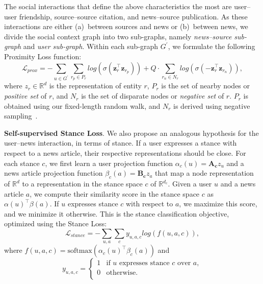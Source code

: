 \documentclass[sigconf]{acmart}
\theoremstyle{definition}
\theoremstyle{hypothesis}
\begin{document}
The social interactions that define the above characteristics the most are user--user friendship, source--source citation, and news--source publication. As these interactions are either (a)~between sources and news or (b)~between news, we divide the social context graph into two sub-graphs, namely \emph{news--source sub-graph} and \emph{user sub-graph}. 
Within each sub-graph $G^{\prime}$, we formulate the following Proximity Loss function:
\begin{equation}\label{eq:proximity_loss}
    \mathcal{L}_{prox} =  - \sum_{u\in G^{\prime}} \sum_{r_p\in P_r} log(\sigma(\boldsymbol{z}_r^\top \boldsymbol{z}_{r_p})) + Q \cdot \sum_{r_n\in N_r} log(\sigma(-\boldsymbol{z}_r^\top \boldsymbol{z}_{r_n})), 
\end{equation}
where $z_r\in \mathbb{R}^d$ is the representation of entity $r$, $P_r$ is the set of nearby nodes or \textit{positive set} of $r$, and $N_r$ is the set of disparate nodes or \textit{negative set} of $r$.
$P_{r}$ is obtained using our fixed-length
random walk, and $N_{r}$ is derived using negative sampling~\cite{Hamilton2017InductiveRL}. 

\textbf{Self-supervised Stance Loss}.
We also propose an analogous hypothesis for the user--news interaction, in terms of stance. If a user expresses a stance with respect to a news article, their respective representations should be close. For each stance $c$, we first learn a user projection function $\alpha_c(u) = \mathbf{A_c} z_u$ and a news article projection function $\beta_c(a) = \mathbf{B_c} z_a$ that map a node representation of $\mathbb{R}^d$ to a representation in the stance space $c$ of $\mathbb{R}^{d_c}$. Given a user $u$ and a news article $a$, we compute their similarity score in the
stance space $c$ as $\alpha(u)^\top \beta(a)$. If $u$ expresses stance $c$ with respect to $a$, we maximize this score, and we minimize it otherwise. This is the stance classification objective, optimized using the Stance Loss: 
\begin{equation}\label{eq:stance_loss}
    \mathcal{L}_{stance} = -\sum_{u,a}\sum_{c} y_{u,a,c} log(f(u,a,c)), 
\end{equation}
where $f(u,a,c) = \text{softmax}(\alpha_c(u)^\top \beta_c(a))$ and
\[  y_{u,a,c} = \left\{
\begin{array}{ll}
      1 & \textrm{if } u \textrm{ expresses stance } c \textrm{ over } a, \\
      0 & \textrm{otherwise}. \\
\end{array} 
\right. \]
\end{document}
